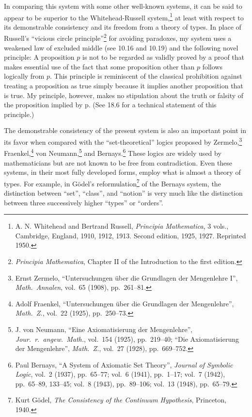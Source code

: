 \documentclass{book}
\let\oldmarginpar\marginpar
\renewcommand*{\marginpar}[1]{\oldmarginpar{\footnotesize#1}}
\begin{document}
In comparing this system with some other well-known systems, it can be said to appear to be superior to the Whitehead-Russell system,\footnote{A. N. Whitehead and Bertrand Russell, \textit{Principia Mathematica}, 3 vols., Cambridge, England, 1910, 1912, 1913. Second edition, 1925, 1927. Reprinted 1950.} at least with respect to its demonstrable consistency and its freedom from a theory of types.  In place of Russell's “vicious circle principle”\footnote{\textit{Principia Mathematica}, Chapter II of the Introduction to the first edition.} for avoiding paradoxes, my system uses a weakened law of excluded middle (see 10.16 and 10.19) and the following novel principle: A proposition \(p\) is not to be regarded as validly proved by a proof that makes essential use of the fact that some proposition other than \(p\) follows logically from \(p\).  This principle is reminiscent of the classical prohibition against treating a proposition as true simply because it implies another proposition that is true.  My principle, however, makes no stipulation about the truth or falsity of the proposition implied by p.  (See 18.6 for a technical statement of this principle.)

The demonstrable consistency of the present system is also an \marginpar{}important point in its favor when compared with the “set-theoretical” logics proposed by Zermelo,\footnote{Ernst Zermelo, “Untersuchungen über die Grundlagen der Mengenlehre I”, \textit{Math.\ Annalen}, vol.\ 65 (1908), pp.\ 261–81.} Fraenkel,\footnote{Adolf Fraenkel, “Untersuchungen über die Grundlagen der Mengenlehre”, \textit{Math.\ Z.}, vol.\ 22 (1925), pp.\ 250–73.} von Neumann,\footnote{J. von Neumann, “Eine Axiomatisierung der Mengenlehre”, \textit{Jour.\ r.\ angew.\ Math.}, vol.\ 154 (1925), pp.\ 219–40; “Die Axiomatisierung der Mengenlehre”, \textit{Math.\ Z.}, vol.\ 27 (1928), pp.\ 669–752.} and Bernays.\footnote{Paul Bernays, “A System of Axiomatic Set Theory”, \textit{Journal of Symbolic Logic}, vol.\ 2 (1937), pp.\ 65–77; vol.\ 6 (1941), pp.\ 1–17; vol.\ 7 (1942), pp.\ 65–89, 133–45; vol.\ 8 (1943), pp.\ 89–106; vol.\ 13 (1948), pp.\ 65–79.}  These logics are widely used by mathematicians but are not known to be free from contradiction.  Even these systems, in their most fully developed forms, employ what is almost a theory of types.  For example, in Gödel's reformulation\footnote{Kurt Gödel, \textit{The Consistency of the Continuum Hypothesis}, Princeton, 1940.} of the Bernays system, the distinction between “set”, “class”, and “notion” is very much like the distinction between three successively higher “types” or “orders”.
\end{document}
